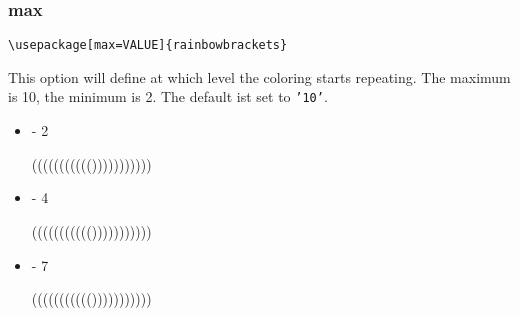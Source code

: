 \documentclass[10pt, a4paper]{article}
\newenvironment{itemizeexample}{
	\begin{itemize}
		\setlength\itemsep{-.5em}
	}
	{
	\end{itemize}
}
\begin{document}
	\subsubsection{max}
	\begin{lstlisting}[style=A]
			\usepackage[max=VALUE]{rainbowbrackets}
	\end{lstlisting}
	This option will define at which level the coloring starts repeating. The maximum is 10, the minimum is 2. The default ist set to \texttt{'10'}.
	\begin{itemizeexample}
		\item[-] 2 \begin{rb}((((((((((()))))))))))\end{rb}
		\item[-] 4 \begin{rb}((((((((((()))))))))))\end{rb}
		\item[-] 7 \begin{rb}((((((((((()))))))))))\end{rb}
	\end{itemizeexample}
\end{document}
